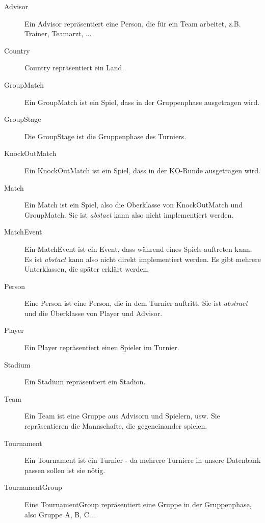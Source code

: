 \documentclass[11pt,german]{scrartcl}
\begin{document}
\begin{description}

\item [Advisor]
Ein Advisor repräsentiert eine Person, die für ein Team arbeitet, z.B. Trainer, Teamarzt, ...

\item [Country]
Country repräsentiert ein Land.

\item [GroupMatch]
Ein GroupMatch ist ein Spiel, dass in der Gruppenphase ausgetragen wird.

\item [GroupStage]
Die GroupStage ist die Gruppenphase des Turniers.

\item [KnockOutMatch]
Ein KnockOutMatch ist ein Spiel, dass in der KO-Runde ausgetragen wird.

\item [Match]
Ein Match ist ein Spiel, also die Oberklasse von KnockOutMatch und GroupMatch. Sie ist {\it abstact} kann also nicht implementiert werden.

\item [MatchEvent]
Ein MatchEvent ist ein Event, dass während eines Spiels auftreten kann. Es ist {\it abstact} kann also nicht direkt implementiert werden.
Es gibt mehrere Unterklassen, die später erklärt werden.

\item [Person]
Eine Person ist eine Person, die in dem Turnier auftritt. Sie ist {\it abstract} und die Überklasse von Player und Advisor.

\item [Player]
Ein Player repräsentiert einen Spieler im Turnier.

\item [Stadium]
Ein Stadium repräsentiert ein Stadion.

\item [Team]
Ein Team ist eine Gruppe aus Advisorn und Spielern, usw. Sie repräsentieren die Mannschafte, die gegeneinander spielen.

\item [Tournament]
Ein Tournament ist ein Turnier - da mehrere Turniere in unsere Datenbank passen sollen ist sie nötig.

\item [TournamentGroup]
Eine TournamentGroup repräsentiert eine Gruppe in der Gruppenphase, also Gruppe A, B, C...

\end{description}
\end{document}
